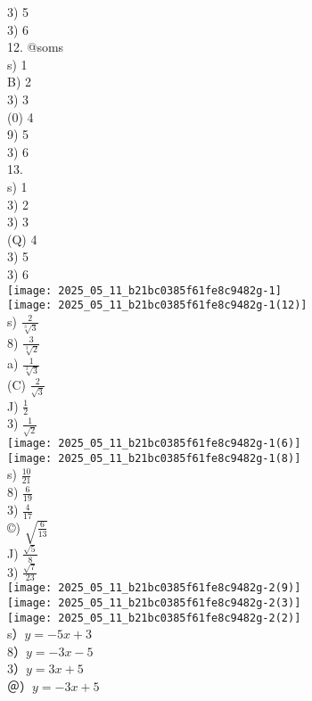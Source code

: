 \documentclass[10pt]{article}
\begin{document}
3) 5\\
3) 6\\
12. @soms\\
s) 1\\
B) 2\\
3) 3\\
(0) 4\\
9) 5\\
3) 6\\
13.\\
s) 1\\
3) 2\\
3) 3\\
(Q) 4\\
3) 5\\
3) 6\\
\texttt{[image: 2025\_05\_11\_b21bc0385f61fe8c9482g-1]}\\
\texttt{[image: 2025\_05\_11\_b21bc0385f61fe8c9482g-1(12)]}\\
s) $\frac{2}{\sqrt[3]{3}}$\\
8) $\frac{3}{\sqrt[3]{2}}$\\
a) $\frac{1}{\sqrt[3]{3}}$\\
(C) $\frac{2}{\sqrt{3}}$\\
J) $\frac{1}{2}$\\
3) $\frac{1}{\sqrt{2}}$\\
\texttt{[image: 2025\_05\_11\_b21bc0385f61fe8c9482g-1(6)]}\\
\texttt{[image: 2025\_05\_11\_b21bc0385f61fe8c9482g-1(8)]}\\
s) $\frac{10}{21}$\\
8) $\frac{6}{19}$\\
3) $\frac{4}{17}$\\
©) $\sqrt{\frac{6}{13}}$\\
J) $\frac{\sqrt{5}}{8}$\\
3) $\frac{\sqrt{7}}{23}$\\
\texttt{[image: 2025\_05\_11\_b21bc0385f61fe8c9482g-2(9)]}\\
\texttt{[image: 2025\_05\_11\_b21bc0385f61fe8c9482g-2(3)]}\\
\texttt{[image: 2025\_05\_11\_b21bc0385f61fe8c9482g-2(2)]}\\
s）$y=-5 x+3$\\
8）$y=-3 x-5$\\
3）$y=3 x+5$\\
＠）$y=-3 x+5$\\
\end{document}
